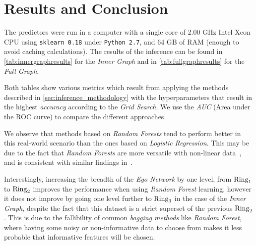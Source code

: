 
\section{Results and Conclusion}
\label{sec:results}





The predictors were run in a computer with a single core of 2.00 GHz Intel Xeon CPU using \texttt{sklearn 0.18} under \texttt{Python 2.7}, and 64 GB of RAM (enough to avoid caching calculations). The results of the inference can be found in \cref{tab:innergraphresults} for the \emph{Inner Graph} and in \cref{tab:fullgraphresults} for the \emph{Full Graph}.


Both tables show various metrics which result from applying the methods described in \cref{sec:inference_methodology} with the hyperparameters that result in the highest \emph{accuracy} according to the \emph{Grid Search}.
We use the \emph{AUC} (Area under the ROC curve) to compare the different approaches.

We observe that methods based on \emph{Random Forests} tend to perform better in this real-world scenario than the ones based on \emph{Logistic Regression}.
This may be due to the fact that \emph{Random Forests} are more versatile with non-linear data~\cite{logisticvsdecision}, and is consistent with similar findings in~\cite{muchlinski2016}.

Interestingly, increasing the breadth of the \emph{Ego Network} by one level, from $\operatorname{Ring}_1$ to $\operatorname{Ring}_2$ improves the performance when using \emph{Random Forest} learning, however it does not improve by going one level further to $\operatorname{Ring}_3$ in the case of the \emph{Inner Graph}, despite the fact that this dataset is a strict superset of the previous $\operatorname{Ring}_2$. This is due to the fallibility of common \emph{bagging methods} like \emph{Random Forest}, where having some noisy or non-informative data to choose from makes it less probable that informative features will be chosen.

